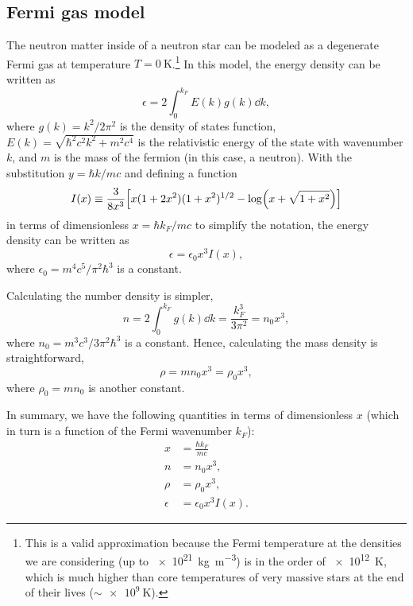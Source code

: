 \documentclass[draft,11pt]{article}
\theoremstyle{definition}
\theoremstyle{remark}
\begin{document}
        \subsection{Fermi gas model} %
            The neutron matter inside of a neutron star can be modeled as a degenerate Fermi gas at temperature $T=\SI{0}{\kelvin}$.\footnote{This is a valid approximation because the Fermi temperature at the densities we are considering (up to \SI{e21}{\kilogram\per\meter\cubed}) is in the order of \SI{e12}{\kelvin}, which is much higher than core temperatures of very massive stars at the end of their lives ($\sim\SI{e9}{\kelvin}$).} In this model, the energy density can be written as \parencite{koonin.1986/computational.physics/rk4.white.dwarf}
            \[\epsilon=2\int_{0}^{k_{F}}E(k)g(k)\dd{k},\] where $g(k)=k^{2}/2\pi^{2}$ is the density of states function, $E(k)=\sqrt{\hbar^{2}c^{2}k^{2}+m^{2}c^{4}}$ is the relativistic energy of the state with wavenumber $k$, and $m$ is the mass of the fermion (in this case, a neutron). With the substitution $y=\hbar k/mc$ and defining a function \parencite{koonin.1986/computational.physics/rk4.white.dwarf} \[I(x)\equiv \frac{3}{8x^{3}}\qty[x(1+2x^{2})(1+x^{2})^{1/2}-\log(x+\sqrt{1+x^{2}})]\] in terms of dimensionless $x=\hbar k_{F}/mc$ to simplify the notation, the energy density can be written as \[\epsilon=\epsilon_{0}x^{3}I(x),\] where $\epsilon_{0}=m^{4}c^{5}/\pi^{2}\hbar^{3}$ is a constant.
            
            Calculating the number density is simpler, \[n=2\int_{0}^{k_{F}}g(k)\dd{k}=\frac{k_{F}^{3}}{3\pi^{2}}=n_{0}x^{3},\] where $n_{0}=m^{3}c^{3}/3\pi^{2}\hbar^{3}$ is a constant. Hence, calculating the mass density is straightforward, \[\rho=mn_{0}x^{3}=\rho_{0}x^{3},\] where $\rho_{0}=mn_{0}$ is another constant.
            
            In summary, we have the following quantities in terms of dimensionless $x$ (which in turn is a function of the Fermi wavenumber $k_{F}$):
                \begin{align}
                    x&=\frac{\hbar k_{F}}{mc}\\
                    n&=n_{0}x^{3},\\
                    \label{eq/fermi/mass.density}\rho&=\rho_{0}x^{3},\\
                    \label{eq/fermi/energy.density}\epsilon&=\epsilon_{0}x^{3}I(x).
                \end{align}
                
\end{document}
